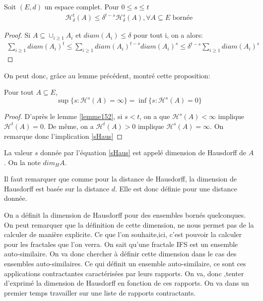 \documentclass[a4paper, 12pt]{report}
\begin{document}
			
			
			\begin{lemma}
			\label{lemme152}
				Soit $(E,d)$ un espace complet. Pour $0\leq s\leq t$
				\begin{align*}
					\mathscr{H}^t_\delta(A)\leq\delta^{t-s}\mathscr{H}^s_\delta(A),\forall A\subseteq E \textrm{ bornée}
				\end{align*}
			\end{lemma}
			\begin{proof}
				Si $A\subseteq \cup_{i\geq 1} A_i$ et $diam(A_i)\leq\delta$ pour tout i, on a alors:
				\begin{align*}
					\sum_{i\geq1}diam(A_i)^t\leqslant\sum_{i\geq1}diam(A_i)^{t-s}diam(A_i)^s\leqslant\delta^{t-s}\sum_{i\geq1}diam(A_i)^s
				\end{align*}
			\end{proof}
\newpage
			On peut donc, grâce au lemme précédent, montré cette proposition:
			\begin{prop}
				Pour tout $A\subseteq E$,
				\begin{equation}
					\label{sHaus}
					\sup\{s:\mathscr{H}^s(A)=\infty\}=\inf\{s:\mathscr{H}^s(A)=0\}
				\end{equation}
			\end{prop}
			\begin{proof}
				D'après le lemme \ref{lemme152}, si $s<t$, on a que $\mathscr{H}^s(A)<\infty$ implique $\mathscr{H}^t(A)=0$. De  même, on a $\mathscr{H}^t(A)>0$ implique $\mathscr{H}^s(A)=\infty$. On remarque donc l'implication \ref{sHaus}
			\end{proof}
			
			
			\begin{definition}
				La valeur $s$ donnée par l'équation \ref{sHaus} est appelé dimension de Hausdorff de $A$. On la note $dim_H A$.
			\end{definition}
			\begin{remark*}
				Il faut remarquer que comme pour la distance de Hausdorff, la dimension de Hausdorff est basée sur la distance $d$. Elle est donc définie pour une distance donnée.
			\end{remark*}
			
			On a définit la dimension de Hausdorff pour des ensembles bornés quelconques. On peut remarquer que la définition de cette dimension, ne nous permet pas de la calculer de manière explicite. Ce que l'on souhaite,ici, c'est pouvoir la calculer pour les fractales que l'on verra. On sait qu'une fractale IFS est un ensemble auto-similaire. On va donc chercher à définir cette dimension dans le cas des ensembles auto-similaires.
			Ce qui définit un ensemble auto-similaire, ce sont ces applications contractantes caractérisées par leurs rapports. On va, donc ,tenter d'exprimé la dimension de Hausdorff en fonction de ces rapports.
			\newline \hspace{0.7 cm} On va dans un premier temps travailler sur une liste de rapports contractants.
			
\end{document}
